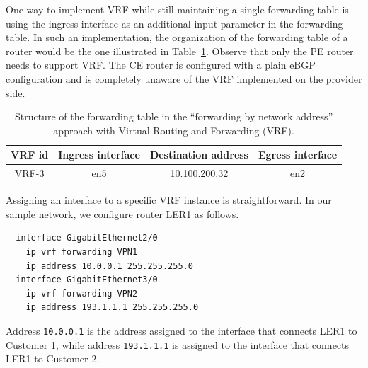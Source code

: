 \documentclass{article}
\newenvironment{codice}
{
\noindent
\begin{minipage}[b]{\columnwidth}
\definecolor{shadecolor}{rgb}{1,1,1}
\begin{framed}}
{
\vspace{-0.4cm}
\end{framed}
\end{minipage}
\definecolor{shadecolor}{rgb}{1,1,0.7}
}
\begin{document}
One way to implement VRF while still maintaining a single forwarding table is 
using the ingress interface as an additional input parameter in the forwarding 
table. In such an implementation, the organization of the forwarding table of a 
router would be the one illustrated in Table~\ref{tab:fib-destination-vrf}. 
Observe that only the PE router needs to support VRF. The CE router is 
configured with a plain eBGP configuration and is completely unaware of the VRF 
implemented on the provider side.

\begin{table}
 \centering
 \begin{tabular}{|c|c|c|c|}
 \hline
 \textbf{VRF id} & \textbf{Ingress interface} & \textbf{Destination address} & 
\textbf{Egress interface} \\
 \hline
 VRF-3 & en5 & 10.100.200.32 & en2 \\
 \hline
 \end{tabular}
 \caption{Structure of the forwarding table in the ``forwarding by network 
address'' approach with Virtual Routing and Forwarding (VRF).}
 \label{tab:fib-destination-vrf}
\end{table}

\begin{shaded}
\noindent
Assigning an interface to a specific VRF instance is straightforward. In our 
sample network, we configure router LER1 as follows.\\

\begin{codice}
\begin{verbatim}
  interface GigabitEthernet2/0
    ip vrf forwarding VPN1
    ip address 10.0.0.1 255.255.255.0
  interface GigabitEthernet3/0
    ip vrf forwarding VPN2
    ip address 193.1.1.1 255.255.255.0
\end{verbatim}
\end{codice}

Address \texttt{10.0.0.1} is the address assigned to the interface that connects LER1
to Customer 1, while address \texttt{193.1.1.1} is assigned to the interface that
connects LER1 to Customer 2.
\end{shaded}



%
%
\end{document}
